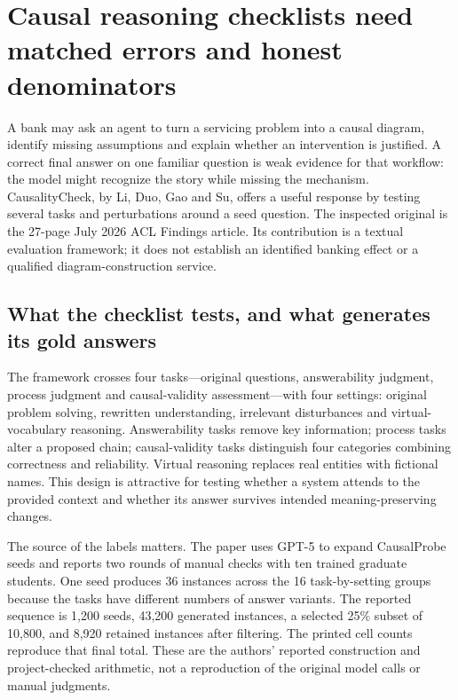 \section{Causal reasoning checklists need matched errors and honest denominators}
\label{exec21:check-scope}
A bank may ask an agent to turn a servicing problem into a causal diagram, identify missing assumptions and explain whether an intervention is justified. A correct final answer on one familiar question is weak evidence for that workflow: the model might recognize the story while missing the mechanism. CausalityCheck, by Li, Duo, Gao and Su, offers a useful response by testing several tasks and perturbations around a seed question. The inspected original is the 27-page July 2026 ACL Findings article. Its contribution is a textual evaluation framework; it does not establish an identified banking effect or a qualified diagram-construction service.\citep{exec21_causalitycheck}

\subsection{What the checklist tests, and what generates its gold answers}
\label{exec21:check-design}
The framework crosses four tasks---original questions, answerability judgment, process judgment and causal-validity assessment---with four settings: original problem solving, rewritten understanding, irrelevant disturbances and virtual-vocabulary reasoning. Answerability tasks remove key information; process tasks alter a proposed chain; causal-validity tasks distinguish four categories combining correctness and reliability. Virtual reasoning replaces real entities with fictional names. This design is attractive for testing whether a system attends to the provided context and whether its answer survives intended meaning-preserving changes.\citep{exec21_causalitycheck}

The source of the labels matters. The paper uses GPT-5 to expand CausalProbe seeds and reports two rounds of manual checks with ten trained graduate students. One seed produces 36 instances across the 16 task-by-setting groups because the tasks have different numbers of answer variants. The reported sequence is 1,200 seeds, 43,200 generated instances, a selected 25\% subset of 10,800, and 8,920 retained instances after filtering. The printed cell counts reproduce that final total. These are the authors' reported construction and project-checked arithmetic, not a reproduction of the original model calls or manual judgments.\citep{exec21_causalitycheck,exec21_causalitycheck_reference}

